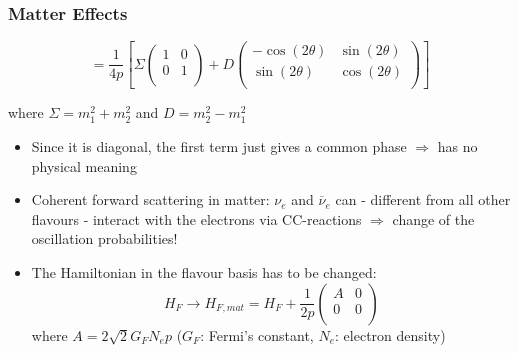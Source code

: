 \documentclass{beamer}
\begin{document}
\begin{frame}
  \frametitle{Matter Effects}

$$
=\frac{1}{4p}\left[ \Sigma 
\left(\begin{array}{cc}
1 & 0\\
0 & 1\\
\end{array}\right)
+D
\left(\begin{array}{cc}
-\cos(2 \theta) & \sin(2 \theta)\\
\sin(2 \theta) & \cos(2 \theta)\\
\end{array}\right)
\right]
$$	
  
\hspace{2cm} where $\Sigma=m_1^2+m_2^2$ and $D=m_2^2-m_1^2$
 
  \begin{itemize}

	\item Since it is diagonal, the first term just gives a common phase $\Rightarrow$ has no physical meaning

	\item Coherent forward scattering in matter: $\nu_e$ and $\overline{\nu}_e$ can - different from all other flavours - interact with the electrons via CC-reactions $\Rightarrow$ change of the oscillation probabilities!

	\item The Hamiltonian in the flavour basis has to be changed: 
$$H_{F} \rightarrow H_{F, mat}=H_{F}+\frac{1}{2p}
\left(\begin{array}{cc}
A & 0\\
0 & 0\\
\end{array}\right)$$
where $A=2\sqrt{2}G_{F}N_{e}p$ ($G_F$: Fermi's constant, $N_e$: electron density)
    
  \end{itemize}
\end{frame}
\end{document}
